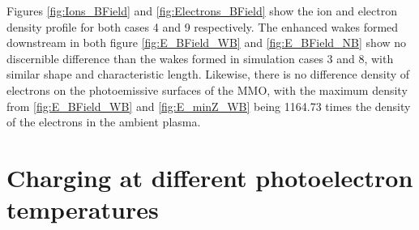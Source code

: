 Figures \ref{fig:Ions_BField} and \ref{fig:Electrons_BField} show the ion and electron density profile for both cases 4 and 9 respectively. The enhanced wakes formed downstream in both figure \ref{fig:E_BField_WB} and \ref{fig:E_BField_NB} show no discernible difference than the wakes formed in simulation cases 3 and 8, with similar shape and characteristic length. Likewise, there is no difference density of electrons on the photoemissive surfaces of the MMO, with the maximum density from \ref{fig:E_BField_WB} and \ref{fig:E_minZ_WB} being 1164.73 times the density of the electrons in the ambient plasma. 


\section{Charging at different photoelectron temperatures}

